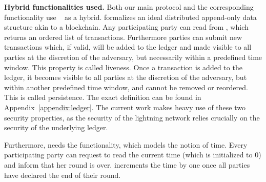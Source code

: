 
  \noindent \textbf{Hybrid functionalities used.}
    Both our main protocol and the corresponding functionality use
    \ledger~\cite{BMTZ17,genesis} as a hybrid. \ledger{} formalizes an ideal
    distributed append-only data structure akin to a blockchain. Any
    participating party can read from \ledger, which returns an ordered list
    of transactions. Furthermore parties can submit new transactions which, if
    valid, will be added to the ledger and made visible to all parties
    at the discretion of the adversary, but necessarily within a predefined time
    window. This property is called liveness. Once a transaction is added to the
    ledger, it becomes visible to all parties at the discretion of the
    adversary, but within another predefined time window, and cannot be removed
    or reordered. This is called persistence. The exact definition can be found
    in Appendix~\ref{appendix:ledger}. The current work makes heavy use
    of these two security properties, as the security of the lightning network
    relies crucially on the security of the underlying ledger.

    Furthermore, \ledger{} needs the \Fclock functionality,
    which models the notion of time. Every participating party can request to
    read the current time (which is initialized to 0) and inform \Fclock that
    her round is over. \Fclock increments the time by one once all parties have
    declared the end of their round.

